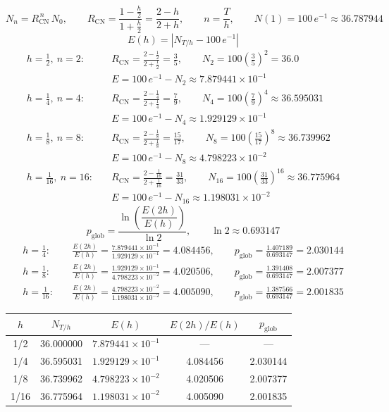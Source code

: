 \[
N_{n} = R_{\mathrm{CN}}^{\,n}\,N_0, \qquad
R_{\mathrm{CN}} = \frac{1 - \frac{h}{2}}{1 + \frac{h}{2}} = \frac{2 - h}{2 + h}, \qquad n = \frac{T}{h}, \qquad
N(1) = 100\,e^{-1} \approx 36.787944
\]
\[
E(h) = \left| N_{T/h} - 100\,e^{-1} \right|
\]
\begin{align*}
	h = \tfrac12,\ n = 2:&\quad R_{\mathrm{CN}} = \frac{2 - \frac12}{2 + \frac12} = \frac35, \qquad
	N_2 = 100\left(\frac35\right)^2 = 36.0\\
	&\quad E = 100\,e^{-1} - N_2 \approx 7.879441\times10^{-1}\\[6pt]
	h = \tfrac14,\ n = 4:&\quad R_{\mathrm{CN}} = \frac{2 - \frac14}{2 + \frac14} = \frac79, \qquad
	N_4 = 100\left(\frac79\right)^4 \approx 36.595031\\
	&\quad E = 100\,e^{-1} - N_4 \approx 1.929129\times10^{-1}\\[6pt]
	h = \tfrac18,\ n = 8:&\quad R_{\mathrm{CN}} = \frac{2 - \frac18}{2 + \frac18} = \frac{15}{17}, \qquad
	N_8 = 100\left(\frac{15}{17}\right)^8 \approx 36.739962\\
	&\quad E = 100\,e^{-1} - N_8 \approx 4.798223\times10^{-2}\\[6pt]
	h = \tfrac1{16},\ n = 16:&\quad R_{\mathrm{CN}} = \frac{2 - \frac1{16}}{2 + \frac1{16}} = \frac{31}{33}, \qquad
	N_{16} = 100\left(\frac{31}{33}\right)^{16} \approx 36.775964\\
	&\quad E = 100\,e^{-1} - N_{16} \approx 1.198031\times10^{-2}
\end{align*}
\[
p_{\mathrm{glob}} = \frac{\ln\!\left(\dfrac{E(2h)}{E(h)}\right)}{\ln 2}, \qquad \ln 2 \approx 0.693147
\]
\begin{align*}
	h = \tfrac14:&\quad \frac{E(2h)}{E(h)} = \frac{7.879441\times10^{-1}}{1.929129\times10^{-1}} = 4.084456,
	\qquad p_{\mathrm{glob}} = \frac{1.407189}{0.693147} = 2.030144\\
	h = \tfrac18:&\quad \frac{E(2h)}{E(h)} = \frac{1.929129\times10^{-1}}{4.798223\times10^{-2}} = 4.020506,
	\qquad p_{\mathrm{glob}} = \frac{1.391408}{0.693147} = 2.007377\\
	h = \tfrac1{16}:&\quad \frac{E(2h)}{E(h)} = \frac{4.798223\times10^{-2}}{1.198031\times10^{-2}} = 4.005090,
	\qquad p_{\mathrm{glob}} = \frac{1.387566}{0.693147} = 2.001835
\end{align*}
\begin{center}
	\begin{tabular}{ccccc}\toprule
		$h$ & $N_{T/h}$ & $E(h)$ & $E(2h)/E(h)$ & $p_{\mathrm{glob}}$\\\midrule
		1/2  & 36.000000 & $7.879441\times10^{-1}$ & ---      & ---      \\
		1/4  & 36.595031 & $1.929129\times10^{-1}$ & 4.084456 & 2.030144 \\
		1/8  & 36.739962 & $4.798223\times10^{-2}$ & 4.020506 & 2.007377 \\
		1/16 & 36.775964 & $1.198031\times10^{-2}$ & 4.005090 & 2.001835 \\\bottomrule
	\end{tabular}
\end{center}

